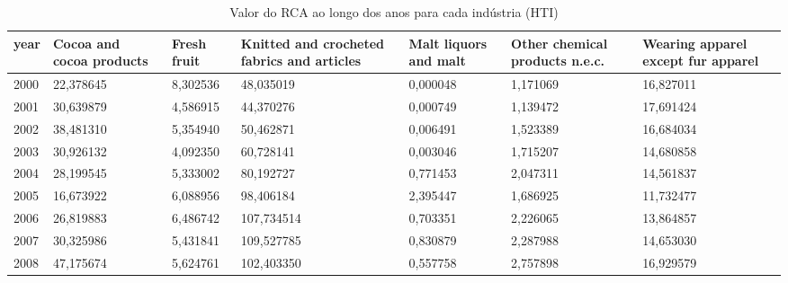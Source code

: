 \begin{table}
\centering
\caption{Valor do RCA ao longo dos anos para cada indústria (HTI)}
\begin{tabular}{p{1cm}p{2cm}p{2cm}p{2cm}p{2cm}p{2cm}p{2cm}}
\toprule
 year &  Cocoa and cocoa products &  Fresh fruit &  Knitted and crocheted fabrics and articles &  Malt liquors and malt &  Other chemical products n.e.c. &  Wearing apparel except fur apparel \\
\midrule
 2000 &                 22,378645 &     8,302536 &                                   48,035019 &               0,000048 &                        1,171069 &                           16,827011 \\
 2001 &                 30,639879 &     4,586915 &                                   44,370276 &               0,000749 &                        1,139472 &                           17,691424 \\
 2002 &                 38,481310 &     5,354940 &                                   50,462871 &               0,006491 &                        1,523389 &                           16,684034 \\
 2003 &                 30,926132 &     4,092350 &                                   60,728141 &               0,003046 &                        1,715207 &                           14,680858 \\
 2004 &                 28,199545 &     5,333002 &                                   80,192727 &               0,771453 &                        2,047311 &                           14,561837 \\
 2005 &                 16,673922 &     6,088956 &                                   98,406184 &               2,395447 &                        1,686925 &                           11,732477 \\
 2006 &                 26,819883 &     6,486742 &                                  107,734514 &               0,703351 &                        2,226065 &                           13,864857 \\
 2007 &                 30,325986 &     5,431841 &                                  109,527785 &               0,830879 &                        2,287988 &                           14,653030 \\
 2008 &                 47,175674 &     5,624761 &                                  102,403350 &               0,557758 &                        2,757898 &                           16,929579 \\

\end{tabular}
\end{table}
